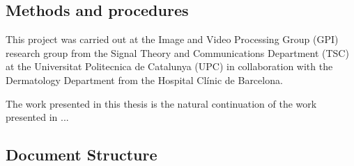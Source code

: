 \documentclass[../main.tex]{subfiles}
\begin{document}
% 
% 
% 



\subsection{Methods and procedures}
\label{sec:methods-and-procedures}
This project was carried out at the Image and Video Processing Group (GPI) research
group from the Signal Theory and Communications Department (TSC) at the Universitat
Politecnica de Catalunya (UPC) in collaboration with the Dermatology Department from
the Hospital Clínic de Barcelona.

The work presented in this thesis is the natural continuation of the work presented
in \cite{Combalia2019}...

\subsection{Document Structure}
\lipsum[2]
\end{document}
